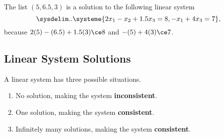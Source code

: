 \begin{example}
  \label{exm:solution_of_linear_system}

  \begin{multicols}{2}
    The list $(5, 6.5,3)$ is a solution to the following linear system
    \[%
      \sysdelim..\systeme{
        2x_1 - x_2 + 1.5x_3 = 8,
        -x_1 + 4x_3 = 7
      }
    ,\]%
    because $2(5) - (6.5) + 1.5(3) \ce 8$ and $-(5) + 4(3) \ce 7$.
    \columnbreak
    \begin{figure}[H]
      \centering


      \caption{}
      \label{fig:two_lines_intersecting_at_a_point}
    \end{figure}
  \end{multicols}
\end{example}

\subsection{Linear System Solutions}
\label{sub_sec:linear_system_solutions}

A linear system has three possible situations.
\begin{enumerate}
  \label{enum:three_possible_solutions}

  \item No solution, making the system \textbf{inconsistent}.
  \item One solution, making the system \textbf{consistent}.
  \item Infinitely many solutions, making the system \textbf{consistent}.
\end{enumerate}

